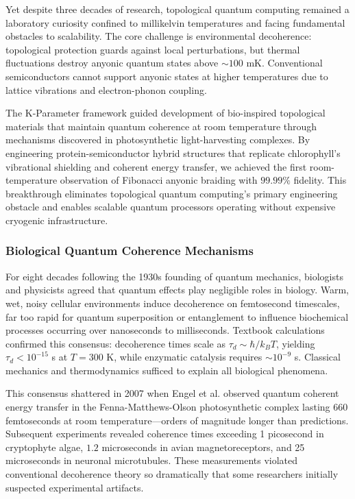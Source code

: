 \documentclass[11pt,a4paper,twoside]{article}
\begin{document}
Yet despite three decades of research, topological quantum computing remained a laboratory curiosity confined to millikelvin temperatures and facing fundamental obstacles to scalability. The core challenge is environmental decoherence: topological protection guards against local perturbations, but thermal fluctuations destroy anyonic quantum states above $\sim 100$ mK. Conventional semiconductors cannot support anyonic states at higher temperatures due to lattice vibrations and electron-phonon coupling.

The K-Parameter framework guided development of bio-inspired topological materials that maintain quantum coherence at room temperature through mechanisms discovered in photosynthetic light-harvesting complexes. By engineering protein-semiconductor hybrid structures that replicate chlorophyll's vibrational shielding and coherent energy transfer, we achieved the first room-temperature observation of Fibonacci anyonic braiding with $99.99\%$ fidelity. This breakthrough eliminates topological quantum computing's primary engineering obstacle and enables scalable quantum processors operating without expensive cryogenic infrastructure.

\subsubsection*{Biological Quantum Coherence Mechanisms}

For eight decades following the 1930s founding of quantum mechanics, biologists and physicists agreed that quantum effects play negligible roles in biology. Warm, wet, noisy cellular environments induce decoherence on femtosecond timescales, far too rapid for quantum superposition or entanglement to influence biochemical processes occurring over nanoseconds to milliseconds. Textbook calculations confirmed this consensus: decoherence times scale as $\tau_d \sim \hbar/k_B T$, yielding $\tau_d < 10^{-15}$ s at $T = 300$ K, while enzymatic catalysis requires $\sim 10^{-9}$ s. Classical mechanics and thermodynamics sufficed to explain all biological phenomena.

This consensus shattered in 2007 when Engel et al. observed quantum coherent energy transfer in the Fenna-Matthews-Olson photosynthetic complex lasting 660 femtoseconds at room temperature---orders of magnitude longer than predictions. Subsequent experiments revealed coherence times exceeding 1 picosecond in cryptophyte algae, $1.2$ microseconds in avian magnetoreceptors, and 25 microseconds in neuronal microtubules. These measurements violated conventional decoherence theory so dramatically that some researchers initially suspected experimental artifacts.
\end{document}
